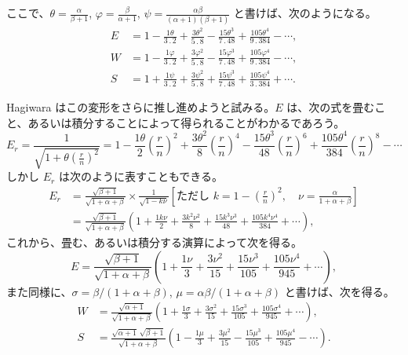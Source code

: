 \documentclass[11pt]{article}
\newcommand{\scanpage}[2]{\clearpage\setcounter{footnote}{0}\noindent{\footnotesize\color{gray}PDF #1 頁 · #2}\par\medskip}
\begin{document}
\scanpage{0335}{印刷頁 321}
\noindent ここで、$\theta = \frac{\alpha}{\beta+1}$, $\varphi = \frac{\beta}{\alpha+1}$, $\psi = \frac{\alpha\beta}{(\alpha+1)(\beta+1)}$ と書けば、次のようになる。
\begin{align*}
E &= 1 - \frac{1\theta}{3\,.\,2} + \frac{3\theta^2}{5\,.\,8} - \frac{15\theta^3}{7\,.\,48} + \frac{105\theta^4}{9\,.\,384} - \cdots,\\
W &= 1 - \frac{1\varphi}{3\,.\,2} + \frac{3\varphi^2}{5\,.\,8} - \frac{15\varphi^3}{7\,.\,48} + \frac{105\varphi^4}{9\,.\,384} - \cdots,\\
S &= 1 + \frac{1\psi}{3\,.\,2} + \frac{3\psi^2}{5\,.\,8} + \frac{15\psi^3}{7\,.\,48} + \frac{105\psi^4}{3\,.\,384} + \cdots.
\end{align*}

Hagiwara はこの変形をさらに推し進めようと試みる。$E$ は、次の式を畳むこと、あるいは積分することによって得られることがわかるであろう。
\[
E_r = \frac{1}{\sqrt{1+\theta\left(\frac{r}{n}\right)^2}} = 1 - \frac{1\theta}{2}\left(\frac{r}{n}\right)^2 + \frac{3\theta^2}{8}\left(\frac{r}{n}\right)^4 - \frac{15\theta^3}{48}\left(\frac{r}{n}\right)^6 + \frac{105\theta^4}{384}\left(\frac{r}{n}\right)^8 - \cdots
\]
しかし $E_r$ は次のように表すこともできる。
\begin{align*}
E_r &= \frac{\sqrt{\beta+1}}{\sqrt{1+\alpha+\beta}} \times \frac{1}{\sqrt{1-k\nu}} \left[\text{ただし } k = 1 - \left(\frac{r}{n}\right)^2,\quad \nu = \frac{\alpha}{1+\alpha+\beta}\right]\\
&= \frac{\sqrt{\beta+1}}{\sqrt{1+\alpha+\beta}}\left(1 + \frac{1k\nu}{2} + \frac{3k^2\nu^2}{8} + \frac{15k^3\nu^3}{48} + \frac{105k^4\nu^4}{384} + \cdots\right),
\end{align*}
これから、畳む、あるいは積分する演算によって次を得る。
\[
E = \frac{\sqrt{\beta+1}}{\sqrt{1+\alpha+\beta}}\left(1 + \frac{1\nu}{3} + \frac{3\nu^2}{15} + \frac{15\nu^3}{105} + \frac{105\nu^4}{945} + \cdots\right),
\]
また同様に、$\sigma = \beta/(1+\alpha+\beta)$, $\mu = \alpha\beta/(1+\alpha+\beta)$ と書けば、次を得る。
\begin{align*}
W &= \frac{\sqrt{\alpha+1}}{\sqrt{1+\alpha+\beta}}\left(1 + \frac{1\sigma}{3} + \frac{3\sigma^2}{15} + \frac{15\sigma^3}{105} + \frac{105\sigma^4}{945} + \cdots\right),\\
S &= \frac{\sqrt{\alpha+1}\,\sqrt{\beta+1}}{\sqrt{1+\alpha+\beta}}\left(1 - \frac{1\mu}{3} + \frac{3\mu^2}{15} - \frac{15\mu^3}{105} + \frac{105\mu^4}{945} - \cdots\right).
\end{align*}
\end{document}
